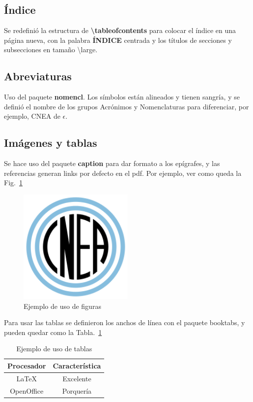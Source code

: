 \documentclass[a4paper,11pt,twoside]{MECOM}
\begin{document}
    \subsection{\'Indice}
        Se redefini\'o la estructura de {\bf \textbackslash tableofcontents} para colocar el \'indice en una p\'agina nueva, con la palabra {\bf \'INDICE} centrada y los t\'itulos de secciones y subsecciones en tama\~no \textbackslash large.
        
        
    \subsection{Abreviaturas}
        Uso del paquete {\bf nomencl}. Los s\'imbolos est\'an alineados y tienen sangr\'ia, y se defini\'o el nombre de los grupos Acr\'onimos y Nomenclaturas para diferenciar, por ejemplo, CNEA de $\epsilon$.
        
    \subsection{Im\'agenes y tablas}
    Se hace uso del paquete {\bf caption} para dar formato a los ep\'igrafes, y las referencias generan links por defecto en el pdf. Por ejemplo, ver como queda la Fig.~\ref{fg:Logo_CNEA}
    \begin{figure}[ht]
        \centering
        \includegraphics[width=0.5\textwidth]{Logo_CNEA}
        \caption{Ejemplo de uso de figuras}
        \label{fg:Logo_CNEA}
    \end{figure}    
    
    \par
    Para usar las tablas se definieron los anchos de l\'inea con el paquete {booktabs}, y pueden quedar como la Tabla.~\ref{tab:prueba}
    \begin{table}[ht]
        \centering
        \begin{tabular}{c c}
            \toprule
            \bf Procesador & \bf Caracter\'istica \\
            \midrule
            \LaTeX{} & Excelente \\
            OpenOffice & Porquer\'ia\\
            \bottomrule
        \end{tabular}
        \caption{Ejemplo de uso de tablas}
        \label{tab:prueba}
    \end{table}    
    
\end{document}
